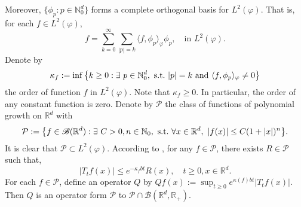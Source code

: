 \documentclass[12pt,oneside,english]{amsart}
\theoremstyle{plain}
\theoremstyle{definition}
\numberwithin{equation}{section}
\begin{document}
    Moreover, $\{\phi_p: p \in \mathbb N_0^d\}$ forms a complete orthogonal basis for $L^2(\varphi)$.
    That is, for each $f\in L^2(\varphi)$,
\begin{equation}\label{semicomp1}
    f
    =\sum_{k=0}^{\infty}\sum_{|p|=k}\langle f, \phi_p \rangle_{\varphi} \phi_p,
    \quad \text{in~} L^2(\varphi).
\end{equation}
    Denote by
\begin{equation}\label{order}
    \kappa_f
    :=\inf \left \{k\geq 0: \exists ~ p\in \mathbb N_0^d ,{\rm ~s.t.~}|p|=k {\rm ~and~}  \langle f, \phi_p \rangle_{\varphi}\neq 0\right \}
\end{equation}
    the order of function $f$ in $L^2(\varphi)$.
    Note that $ \kappa_f\geq 0$.
    In particular, the order of any constant function is zero.
{
    Denote by $\mathcal P$ the class of functions of polynomial growth on $\mathbb R^d$ with
\begin{equation}
    \mathcal{P}
    :=\big \{f\in \mathscr B(\mathbb{R}^d):\exists~ C>0, n \in \mathbb N_0, {\rm ~s.t.~} \forall x\in \mathbb{R}^d,~ |f(x)|\leq C(1+|x|)^n\big\}.
\end{equation}
    It is clear that $\mathcal{P} \subset L^2(\varphi)$.
    According to \cite[Fact 1.2]{MM}, for any $f \in \mathcal{P}$, there exists $R \in \mathcal{P}$ such that,
\begin{equation}
\label{eq:semigroupineq}
    |T_tf(x)|
    \leq e^{-\kappa_f bt} R(x),
    \quad t\geq 0, x\in \mathbb R^d.
\end{equation}
	For each $f\in \mathcal {P}$, define an operator $Q$ by $Qf(x):=\sup_{t\geq 0}e^{\kappa(f)bt} |T_tf(x)|$. 
	Then $Q$ is an operator form $\mathcal P$ to $\mathcal P \cap \mathscr B
	(\mathbb R^d,\mathbb R_+)$.
}
\end{document}
